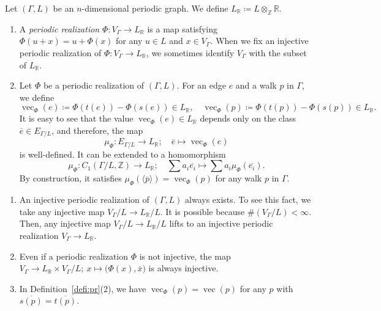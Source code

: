 \documentclass[ALCO,published]{cedram}
\theoremstyle{remark}
\begin{document}
\begin{defi}\label{defi:pr}
Let $(\Gamma,L)$ be an $n$-dimensional periodic graph.
We define $L_{\mathbb{R}} \coloneqq  L \otimes _{\mathbb{Z}} \mathbb{R}$. 
\begin{enumerate}
\item 
A \textit{periodic realization} $\Phi\colon V_{\Gamma} \to L_{\mathbb{R}}$ is a map satisfying
$\Phi(u+x) = u + \Phi(x)$ for any $u \in L$ and $x \in V _{\Gamma}$. 
When we fix an injective periodic realization of $\Phi\colon V _{\Gamma} \to L_{\mathbb{R}}$, 
we sometimes identify $V _{\Gamma}$ with the subset of $L_{\mathbb{R}}$. 

\item 
Let $\Phi$ be a periodic realization of $(\Gamma, L)$. 
For an edge $e$ and a walk $p$ in $\Gamma$, we define 
\[
\operatorname{vec}_{\Phi}(e) \coloneqq  \Phi(t(e)) - \Phi(s(e)) \in L_{\mathbb{R}}, \quad
\operatorname{vec}_{\Phi}(p) \coloneqq  \Phi(t(p)) - \Phi(s(p)) \in L_{\mathbb{R}}. 
\]
It is easy to see that the value $\operatorname{vec}_{\Phi}(e) \in L_{\mathbb{R}}$ depends only on the class $\overline{e} \in E_{\Gamma /L}$, 
and therefore, 
the map 
\[
\mu _{\Phi} : E_{\Gamma /L} \to L_{\mathbb{R}};\quad \overline{e} \mapsto \operatorname{vec}_{\Phi}(e)
\]
is well-defined. 
It can be extended to a homomorphism 
\[
\mu _{\Phi}: C_1(\Gamma/L, \mathbb{Z}) \to L_{\mathbb{R}}; \quad 
\sum a_i \overline{e_i} \mapsto \sum a_i \mu _{\Phi} (\overline{e_i}). 
\]
By construction, it satisfies $\mu _{\Phi} (\langle \overline{p} \rangle) = \operatorname{vec}_{\Phi}(p)$ for any walk $p$ in $\Gamma$. 
\end{enumerate}
\end{defi}

\begin{rmk}\label{rmk:finmap}\hfill
\begin{enumerate} 
\item 
An injective periodic realization of $(\Gamma, L)$ always exists. 
To see this fact, we take any injective map $V_{\Gamma} / L \to L_{\mathbb{R}}/L$. 
It is possible because $\# (V_{\Gamma} / L) < \infty$. 
Then, any injective map $V_{\Gamma} / L \to L_{\mathbb{R}}/L$ lifts to 
an injective periodic realization $V_{\Gamma} \to L_{\mathbb{R}}$. 

\item 
Even if a periodic realization $\Phi$ is not injective, 
the map $V_{\Gamma} \to L_{\mathbb{R}} \times V_{\Gamma}/L;\ x \mapsto \bigl( \Phi(x), \overline{x} \bigr)$ is always injective. 

\item
In Definition~\ref{defi:pr}(2), we have $\operatorname{vec}_{\Phi}(p) = \operatorname{vec}(p)$
for any $p$ with $\overline{s(p)} = \overline{t(p)}$.
\end{enumerate}
\end{rmk}
\end{document}
